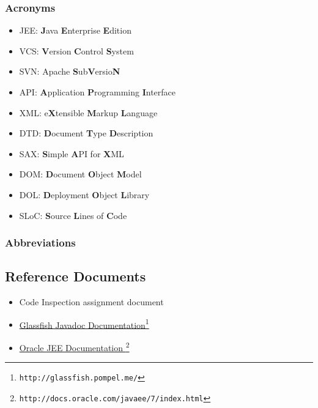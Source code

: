 \subsubsection{Acronyms}
\begin{itemize}
	\item JEE: \textbf{J}ava \textbf{E}nterprise \textbf{E}dition
	\item VCS: \textbf{V}ersion \textbf{C}ontrol \textbf{S}ystem
	\item SVN: Apache \textbf{S}ub\textbf{V}ersio\textbf{N}
	\item API: \textbf{A}pplication \textbf{P}rogramming \textbf{I}nterface
	\item XML: e\textbf{X}tensible \textbf{M}arkup \textbf{L}anguage
	\item DTD: \textbf{D}ocument \textbf{T}ype \textbf{D}escription
	\item SAX: \textbf{S}imple \textbf{A}PI for \textbf{X}ML
	\item DOM: \textbf{D}ocument \textbf{O}bject \textbf{M}odel
	\item DOL: \textbf{D}eployment \textbf{O}bject \textbf{L}ibrary
	\item SLoC: \textbf{S}ource \textbf{L}ines of \textbf{C}ode
\end{itemize}
\subsubsection{Abbreviations}
\subsection{Reference Documents}
\begin{itemize}
	\item Code Inspection assignment document
	\item \href{http://glassfish.pompel.me/}{Glassfish Javadoc Documentation}\footnote{\texttt{http://glassfish.pompel.me/}}
	\item \href{http://docs.oracle.com/javaee/7/index.html}{Oracle JEE Documentation }\footnote{\texttt{http://docs.oracle.com/javaee/7/index.html}}
\end{itemize}
